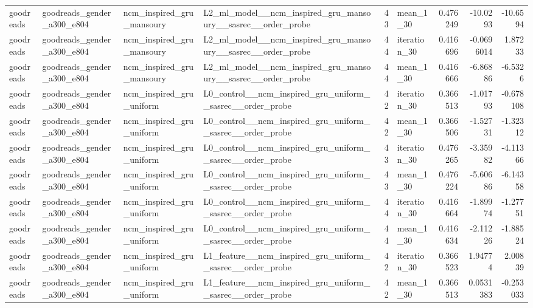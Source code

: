 \begin{table}[htbp!]
\begin{tabular}{llllrlrrr}
goodreads & goodreads\_gender\_a300\_e804 & ncm\_inspired\_gru\_mansoury & L2\_ml\_model\_\_ncm\_inspired\_gru\_mansoury\_\_sasrec\_\_order\_probe & 43 & mean\_1\_30 & 0.476249 & -10.0293 & -10.6594 \\
goodreads & goodreads\_gender\_a300\_e804 & ncm\_inspired\_gru\_mansoury & L2\_ml\_model\_\_ncm\_inspired\_gru\_mansoury\_\_sasrec\_\_order\_probe & 44 & iteration\_30 & 0.416696 & -0.0696014 & 1.87233 \\
goodreads & goodreads\_gender\_a300\_e804 & ncm\_inspired\_gru\_mansoury & L2\_ml\_model\_\_ncm\_inspired\_gru\_mansoury\_\_sasrec\_\_order\_probe & 44 & mean\_1\_30 & 0.416666 & -6.86886 & -6.5326 \\
goodreads & goodreads\_gender\_a300\_e804 & ncm\_inspired\_gru\_uniform & L0\_control\_\_ncm\_inspired\_gru\_uniform\_\_sasrec\_\_order\_probe & 42 & iteration\_30 & 0.366513 & -1.01793 & -0.678108 \\
goodreads & goodreads\_gender\_a300\_e804 & ncm\_inspired\_gru\_uniform & L0\_control\_\_ncm\_inspired\_gru\_uniform\_\_sasrec\_\_order\_probe & 42 & mean\_1\_30 & 0.366506 & -1.52731 & -1.32312 \\
goodreads & goodreads\_gender\_a300\_e804 & ncm\_inspired\_gru\_uniform & L0\_control\_\_ncm\_inspired\_gru\_uniform\_\_sasrec\_\_order\_probe & 43 & iteration\_30 & 0.476265 & -3.35982 & -4.11366 \\
goodreads & goodreads\_gender\_a300\_e804 & ncm\_inspired\_gru\_uniform & L0\_control\_\_ncm\_inspired\_gru\_uniform\_\_sasrec\_\_order\_probe & 43 & mean\_1\_30 & 0.476224 & -5.60686 & -6.14358 \\
goodreads & goodreads\_gender\_a300\_e804 & ncm\_inspired\_gru\_uniform & L0\_control\_\_ncm\_inspired\_gru\_uniform\_\_sasrec\_\_order\_probe & 44 & iteration\_30 & 0.416664 & -1.89974 & -1.27751 \\
goodreads & goodreads\_gender\_a300\_e804 & ncm\_inspired\_gru\_uniform & L0\_control\_\_ncm\_inspired\_gru\_uniform\_\_sasrec\_\_order\_probe & 44 & mean\_1\_30 & 0.416634 & -2.11226 & -1.88524 \\
goodreads & goodreads\_gender\_a300\_e804 & ncm\_inspired\_gru\_uniform & L1\_feature\_\_ncm\_inspired\_gru\_uniform\_\_sasrec\_\_order\_probe & 42 & iteration\_30 & 0.366523 & 1.94774 & 2.00839 \\
goodreads & goodreads\_gender\_a300\_e804 & ncm\_inspired\_gru\_uniform & L1\_feature\_\_ncm\_inspired\_gru\_uniform\_\_sasrec\_\_order\_probe & 42 & mean\_1\_30 & 0.366513 & 0.0531383 & -0.253033 \\

\end{tabular}
\end{table}
